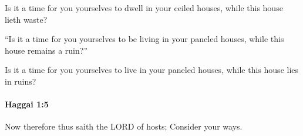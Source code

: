 			\begin{versebox}
					\item[BHS] 
					\item[LXX] 
					\item[ASV] Is it a time for you yourselves to dwell in your ceiled houses, while this house lieth waste?
					\item[NIV] “Is it a time for you yourselves to be living in your paneled houses, while this house remains a ruin?”
					\item[NRSV] Is it a time for you yourselves to live in your paneled houses, while this house lies in ruins?
			\end{versebox}

		\paragraph{Haggai 1:5} %
			\label{HAGGAI-1-5}

			Now therefore thus saith the LORD of hosts; Consider your ways.


